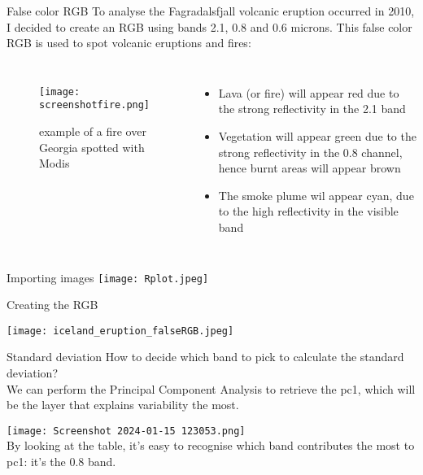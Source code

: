 \documentclass{beamer}
\begin{document}
\begin{frame}{False color RGB}
    \small{To analyse the Fagradalsfjall volcanic eruption occurred in 2010, I decided to create an RGB using bands 2.1, 0.8 and 0.6 microns. This false color RGB is used to spot volcanic eruptions and fires:}
     \begin{columns}
        \centering
        \begin{figure}[h]
            \centering
            \texttt{[image: screenshotfire.png]}
            \caption{example of a fire over Georgia spotted with Modis}
        \end{figure}
        \begin{itemize}
  \item Lava (or fire) will appear red due to the strong reflectivity in the 2.1 band
  \item Vegetation will appear green due to the strong reflectivity in the 0.8 channel, hence burnt areas will appear brown 
  \item The smoke plume wil appear cyan, due to the high reflectivity in the visible band
 \end{itemize}    
    \end{columns}
\end{frame}

\begin{frame}{Importing images}
  \texttt{[image: Rplot.jpeg]}
\end{frame}

\begin{frame}{Creating the RGB}
    
  \centering
  \texttt{[image: iceland\_eruption\_falseRGB.jpeg]}
\end{frame}

\begin{frame}{Standard deviation}
  \small{How to decide which band to pick to calculate the standard deviation?\\
  We can perform the Principal Component Analysis to retrieve the pc1, which will be the layer that explains variability the most.}
    
  \texttt{[image: Screenshot 2024-01-15 123053.png]}\\
  \small{By looking at the table, it's easy to recognise which band contributes the most to pc1: it's the 0.8 band.}
\end{frame}
\end{document}

